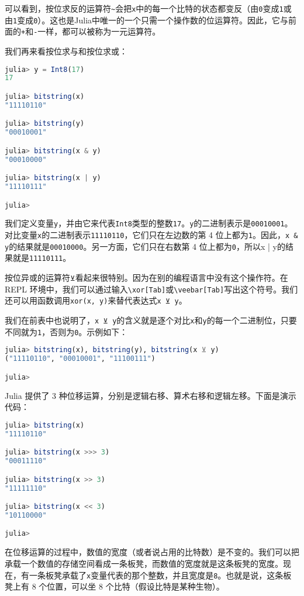 可以看到，按位求反的运算符\verb`~`会把\verb`x`中的每一个比特的状态都变反（由\verb`0`变成\verb`1`或由\verb`1`变成\verb`0`）。这也是Julia中唯一的一个只需一个操作数的位运算符。因此，它与前面的\verb`+`和\verb`-`一样，都可以被称为一元运算符。

我们再来看按位求与和按位求或：
\begin{lstlisting}[language=julia]
julia> y = Int8(17)
17

julia> bitstring(x)
"11110110"

julia> bitstring(y)
"00010001"

julia> bitstring(x & y)
"00010000"

julia> bitstring(x | y)
"11110111"

julia>
\end{lstlisting}

我们定义变量\verb`y`，并由它来代表\verb`Int8`类型的整数\verb`17`。\verb`y`的二进制表示是\verb`00010001`。对比变量\verb`x`的二进制表示\verb`11110110`，它们只在左边数的第 4 位上都为\verb`1`。因此，\verb`x & y`的结果就是\verb`00010000`。另一方面，它们只在右数第 4 位上都为\verb`0`，所以x | y的结果就是\verb`11110111`。

按位异或的运算符\verb`⊻`看起来很特别。因为在别的编程语言中没有这个操作符。在 REPL 环境中，我们可以通过输入\verb`\xor[Tab]`或\verb`\veebar[Tab]`写出这个符号。我们还可以用函数调用\verb`xor(x, y)`来替代表达式\verb`x ⊻ y`。

我们在前表中也说明了，\verb`x ⊻ y`的含义就是逐个对比\verb`x`和\verb`y`的每一个二进制位，只要不同就为\verb`1`，否则为\verb`0`。示例如下：
\begin{lstlisting}[language=julia]
julia> bitstring(x), bitstring(y), bitstring(x ⊻ y)
("11110110", "00010001", "11100111")

julia> 
\end{lstlisting}

Julia 提供了 3 种位移运算，分别是逻辑右移、算术右移和逻辑左移。下面是演示代码：
\begin{lstlisting}[language=julia]
julia> bitstring(x)
"11110110"

julia> bitstring(x >>> 3)
"00011110"

julia> bitstring(x >> 3)
"11111110"

julia> bitstring(x << 3)
"10110000"

julia>
\end{lstlisting}

在位移运算的过程中，数值的宽度（或者说占用的比特数）是不变的。我们可以把承载一个数值的存储空间看成一条板凳，而数值的宽度就是这条板凳的宽度。现在，有一条板凳承载了\verb`x`变量代表的那个整数，并且宽度是\verb`8`。也就是说，这条板凳上有 8 个位置，可以坐 8 个比特（假设比特是某种生物）。

